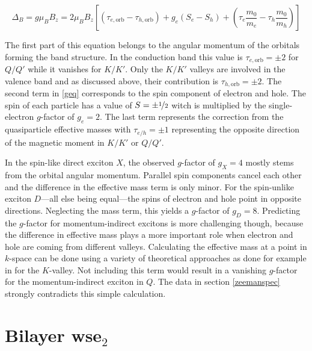 \[\Delta_B=g\mu_BB_z = 2\mu_BB_z\left[(\tau_{e, \mathrm{orb}}-\tau_{h, \mathrm{orb}})+g_e(S_e-S_h) + \left(\tau_e \frac{m_0}{m_e}-\tau_h \frac{m_0}{m_h}\right)\right]\label{geq}\]

The first part of this equation belongs to the angular momentum of the orbitals forming the band structure. In the conduction band this value is $\tau_{e, \mathrm{orb}}=\pm2$ for $Q/Q'$ while it vanishes for $K/K'$. Only the $K/K'$ valleys are involved in the valence band and as discussed above, their contribution is $\tau_{h, \mathrm{orb}}=\pm2$. The second term in \eqref{geq} corresponds to the spin component of electron and hole. The spin of each particle has a value of $S=\pm\nicefrac{1}{2}$ witch is multiplied by the single-electron $g$-factor of $g_e=2$. The last term represents the correction from the quasiparticle effective masses with $\tau_{e/h}=\pm1$ representing the opposite direction of the magnetic moment in $K/K'$ or $Q/Q'$.

In the spin-like direct exciton $X$, the observed $g$-factor of $g_X=4$ mostly stems from the orbital angular momentum. Parallel spin components cancel each other and the difference in the effective mass term is only minor. For the spin-unlike exciton $D$---all else being equal---the spins of electron and hole point in opposite directions. Neglecting the mass term, this yields a $g$-factor of $g_D=8$. Predicting the $g$-factor for momentum-indirect excitons is more challenging though, because the difference in effective mass plays a more important role when electron and hole are coming from different valleys. Calculating the effective mass at a point in $k$-space can be done using a variety of theoretical approaches as done for example in  \cite{rybkovskiy_atomically_2017} for the $K$-valley. Not including this term would result in a vanishing $g$-factor for the momentum-indirect exciton in $Q$. The data in section \ref{zeemanspec} strongly contradicts this simple calculation.

\section{Bilayer ws\textup{e}$_2$}\label{bilayer_theory}


